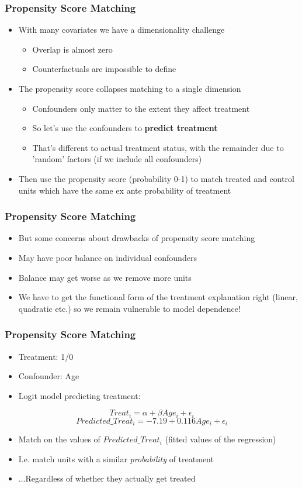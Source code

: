 \documentclass[xcolor=x11names,compress]{beamer}\usepackage[]{graphicx}\usepackage[]{color}
\renewcommand{\(}{\begin{columns}}
\renewcommand{\)}{\end{columns}}
\newcommand{\<}[1]{\begin{column}{#1}}
\renewcommand{\>}{\end{column}}
\begin{document}
\begin{frame}
\frametitle{Propensity Score Matching}
\begin{itemize}
\item With many covariates we have a dimensionality challenge
\pause
\begin{itemize}
\item Overlap is almost zero
\pause
\item Counterfactuals are impossible to define
\end{itemize}
\item The propensity score collapses matching to a single dimension
\pause
\begin{itemize}
\item Confounders only matter to the extent they affect treatment
\pause
\item So let's use the confounders to \textbf{predict treatment}
\pause
\item That's different to actual treatment status, with the remainder due to 'random' factors (if we include all confounders)
\pause
\end{itemize}
\item Then use the propensity score (probability 0-1) to match treated and control units which have the same ex ante probability of treatment
\end{itemize}
\end{frame}

\begin{frame}
\frametitle{Propensity Score Matching}
\begin{itemize}
\item But some concerns about drawbacks of propensity score matching
\pause
\item May have poor balance on individual confounders
\pause
\item Balance may get worse as we remove more units
\pause
\item We have to get the functional form of the treatment explanation right (linear, quadratic etc.) so we remain vulnerable to model dependence!
\end{itemize}
\end{frame}

\begin{frame}
\frametitle{Propensity Score Matching}
\begin{itemize}
\item Treatment: 1/0
\item Confounder: Age
\item Logit model predicting treatment:
\end{itemize}
$$Treat_i = \alpha + \beta Age_i +\epsilon_i$$
\pause
$$Predicted\_Treat_i = -7.19 + 0.116 Age_i +\epsilon_i$$
\pause
\begin{itemize}
\item Match on the values of $Predicted\_Treat_i$ (fitted values of the regression)
\pause
\item I.e. match units with a similar \textit{probability} of treatment
\pause
\item ...Regardless of whether they actually get treated
\end{itemize}
\end{frame}
\end{document}

